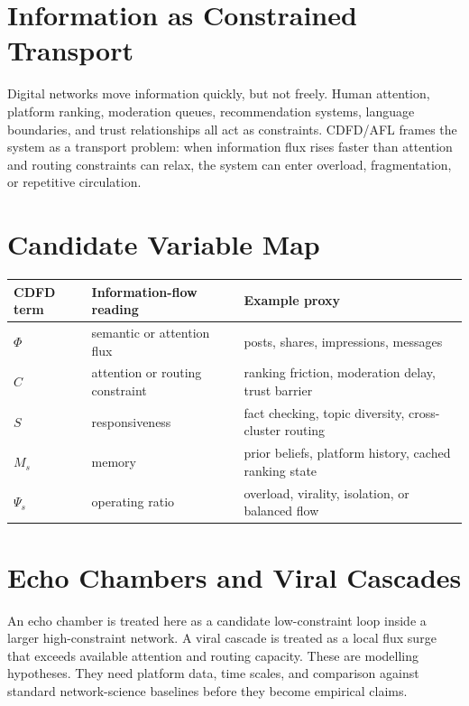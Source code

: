 \documentclass[12pt,a4paper]{article}
\begin{document}
\section{Information as Constrained Transport}

Digital networks move information quickly, but not freely. Human attention,
platform ranking, moderation queues, recommendation systems, language
boundaries, and trust relationships all act as constraints. CDFD/AFL frames the
system as a transport problem: when information flux rises faster than attention
and routing constraints can relax, the system can enter overload, fragmentation,
or repetitive circulation.

\section{Candidate Variable Map}

\begin{table}[h]
\centering
\begin{tabularx}{\textwidth}{@{}lXX@{}}
\toprule
CDFD term & Information-flow reading & Example proxy \\
\midrule
$\Phi$ & semantic or attention flux & posts, shares, impressions, messages \\
$C$ & attention or routing constraint & ranking friction, moderation delay, trust barrier \\
$S$ & responsiveness & fact checking, topic diversity, cross-cluster routing \\
$M_s$ & memory & prior beliefs, platform history, cached ranking state \\
$\Psi_s$ & operating ratio & overload, virality, isolation, or balanced flow \\
\bottomrule
\end{tabularx}
\end{table}

\section{Echo Chambers and Viral Cascades}

An echo chamber is treated here as a candidate low-constraint loop inside a
larger high-constraint network. A viral cascade is treated as a local flux surge
that exceeds available attention and routing capacity. These are modelling
hypotheses. They need platform data, time scales, and comparison against
standard network-science baselines before they become empirical claims.
\end{document}
